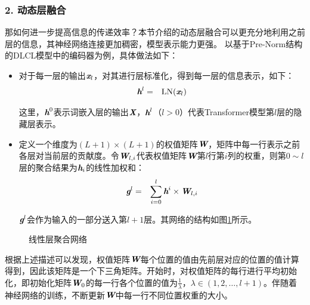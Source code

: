 \subsubsection{2. 动态层融合}

\parinterval 那如何进一步提高信息的传递效率？本节介绍的动态层融合可以更充分地利用之前层的信息，其神经网络连接更加稠密，模型表示能力更强。 以基于Pre-Norm结构的DLCL模型中的编码器为例，具体做法如下：

\begin{itemize}
\vspace{0.5em}
\item 对于每一层的输出$\textbf{\em x}_{l}$，对其进行层标准化，得到每一层的信息表示，如下：
\begin{eqnarray}
\textbf{\em h}^l &=& \textrm{LN}(\textbf{\em x}_{l})
\label{eq:15-37}
\end{eqnarray}

\noindent 这里，$\textbf{\em h}^0$表示词嵌入层的输出$\textbf{\em X}$，$\textbf{\em h}^l$（$l>0$）代表Transformer模型第$l$层的隐藏层表示。

\vspace{0.5em}
\item 定义一个维度为$(L+1)\times (L+1)$的权值矩阵$\textbf{\em W}$，矩阵中每一行表示之前各层对当前层的贡献度。令$\textbf{\em W}_{l,i}$代表权值矩阵$\textbf{\em W}$第$l$行第$i$列的权重，则第$0 \sim l$ 层的聚合结果为$\textbf{\em h}_i$的线性加权和：
\begin{eqnarray}
\textbf{\em g}^l &=& \sum_{i=0}^{l}\textbf{\em h}^i\times \textbf{\em W}_{l,i}
\label{eq:15-38}
\end{eqnarray}

\noindent $\textbf{\em g}^l$会作为输入的一部分送入第$l+1$层。其网络的结构如图\ref{fig:15-13}所示。
\vspace{0.5em}
\end{itemize}

\begin{figure}[htp]
\centering

\caption{线性层聚合网络}
\label{fig:15-13}
\end{figure}

\parinterval 根据上述描述可以发现，权值矩阵$\textbf{\em W}$每个位置的值由先前层对应的位置的值计算得到，因此该矩阵是一个下三角矩阵。开始时，对权值矩阵的每行进行平均初始化，即初始化矩阵$\textbf{\em W}_0$的每一行各个位置的值为$\frac{1}{\lambda}$，$\lambda \in (1,2,\ldots,l+1)$。伴随着神经网络的训练，不断更新$\textbf{\em W}$中每一行不同位置权重的大小。


